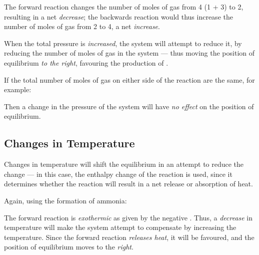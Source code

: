 			The forward reaction changes the number of moles of gas from \num{4} (\num{1} + \num{3}) to \num{2}, resulting in a net
			\textit{decrease}; the backwards reaction would thus increase the number of moles of gas from \num{2} to \num{4}, a net
			\textit{increase}.

			When the total pressure is \textit{increased}, the system will attempt to reduce it, by reducing the number of moles of gas
			in the system --- thus moving the position of equilibrium \textit{to the right}, favouring the production of .

			If the total number of moles of gas on either side of the reaction are the same, for example:


			Then a change in the pressure of the system will have \textit{no effect} on the position of equilibrium.



		\subsection{Changes in Temperature}

			Changes in temperature will shift the equilibrium in an attempt to reduce the change --- in this case, the enthalpy change
			of the reaction is used, since it determines whether the reaction will result in a net release or absorption of heat.

			Again, using the formation of ammonia:


			The forward reaction is \textit{exothermic} as given by the negative \enth{}. Thus, a \textit{decrease} in temperature will
			make the system attempt to compensate by increasing the temperature. Since the forward reaction \textit{releases heat}, it will
			be favoured, and the position of equilibrium moves to the \textit{right}.

